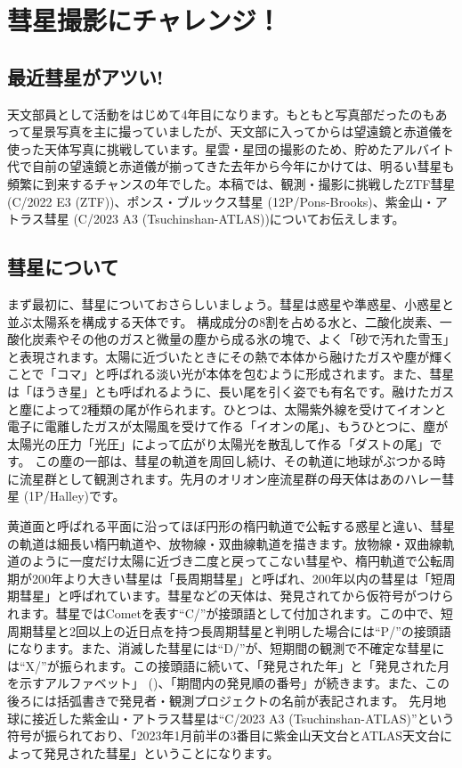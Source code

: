 \documentclass[../../super_nova_2024]{subfiles}
\begin{document}
\chapter{彗星撮影にチャレンジ！} %


\section{最近彗星がアツい!}

天文部員として活動をはじめて4年目になります。もともと写真部だったのもあって星景写真を主に撮っていましたが、天文部に入ってからは望遠鏡と赤道儀を使った天体写真に挑戦しています。星雲・星団の撮影のため、貯めたアルバイト代で自前の望遠鏡と赤道儀が揃ってきた去年から今年にかけては、明るい彗星も頻繁に到来するチャンスの年でした。本稿では、観測・撮影に挑戦したZTF彗星 (C/2022 E3 (ZTF))、ポンス・ブルックス彗星 (12P/Pons-Brooks)、紫金山・アトラス彗星 (C/2023 A3 (Tsuchinshan-ATLAS))についてお伝えします。

\section{彗星について}

まず最初に、彗星についておさらしいましょう。彗星は惑星や準惑星、小惑星と並ぶ太陽系を構成する天体です。
構成成分の8割を占める水と、二酸化炭素、一酸化炭素やその他のガスと微量の塵から成る氷の塊で、よく「砂で汚れた雪玉」と表現されます。太陽に近づいたときにその熱で本体から融けたガスや塵が輝くことで「コマ」と呼ばれる淡い光が本体を包むように形成されます。また、彗星は「ほうき星」とも呼ばれるように、長い尾を引く姿でも有名です。融けたガスと塵によって2種類の尾が作られます。ひとつは、太陽紫外線を受けてイオンと電子に電離したガスが太陽風を受けて作る「イオンの尾」、もうひとつに、塵が太陽光の圧力「光圧」によって広がり太陽光を散乱して作る「ダストの尾」です。
この塵の一部は、彗星の軌道を周回し続け、その軌道に地球がぶつかる時に流星群として観測されます。先月のオリオン座流星群の母天体はあのハレー彗星 (1P/Halley)です。

黄道面と呼ばれる平面に沿ってほぼ円形の楕円軌道で公転する惑星と違い、彗星の軌道は細長い楕円軌道や、放物線・双曲線軌道を描きます。放物線・双曲線軌道のように一度だけ太陽に近づき二度と戻ってこない彗星や、楕円軌道で公転周期が200年より大きい彗星は「長周期彗星」と呼ばれ、200年以内の彗星は「短周期彗星」と呼ばれています。彗星などの天体は、発見されてから仮符号がつけられます。彗星ではCometを表す``C/''が接頭語として付加されます。この中で、短周期彗星と2回以上の近日点を持つ長周期彗星と判明した場合には``P/''の接頭語になります。また、消滅した彗星には``D/''が、短期間の観測で不確定な彗星には``X/''が振られます。この接頭語に続いて、「発見された年」と「発見された月を示すアルファベット」 ()、「期間内の発見順の番号」が続きます。また、この後ろには括弧書きで発見者・観測プロジェクトの名前が表記されます。
先月地球に接近した紫金山・アトラス彗星は``C/2023 A3 (Tsuchinshan-ATLAS)''という符号が振られており、「2023年1月前半の3番目に紫金山天文台とATLAS天文台によって発見された彗星」ということになります。
\end{document}
